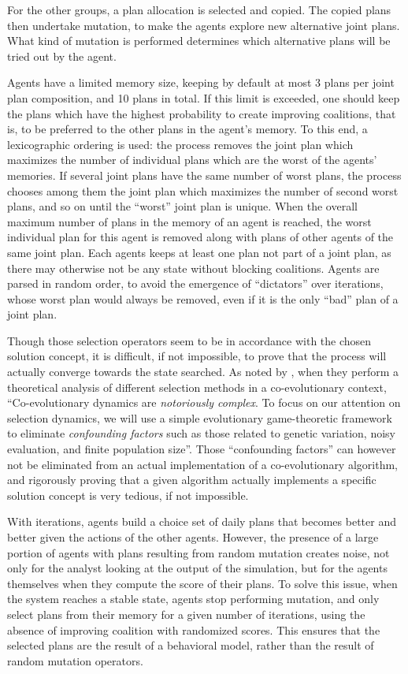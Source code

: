 {For the other groups, a plan allocation is selected and copied. The
copied plans then undertake mutation, to make the agents explore new
alternative joint plans. What kind of mutation is performed determines
which alternative plans will be tried out by the agent.

Agents have a limited memory size, keeping by default at most 3 plans per joint
plan composition, and 10 plans in total. If this limit is exceeded, one
should keep the plans which have the highest probability to create
improving coalitions, that is, to be preferred to the other plans in the
agent's memory. To this end, a lexicographic ordering is used: the
process removes the joint plan which maximizes the number of individual
plans which are the worst of the agents' memories. If several joint
plans have the same number of worst plans, the process chooses among
them the joint plan which maximizes the number of second worst plans,
and so on until the ``worst'' joint plan is unique. When the overall
maximum number of plans in the memory of an agent is reached, the worst
individual plan for this agent is removed along with plans of other
agents of the same joint plan. Each agents keeps at least one plan not
part of a joint plan, as there may otherwise not be any state without
blocking coalitions. Agents are parsed in random order, to avoid the
emergence of ``dictators'' over iterations, whose worst plan would
always be removed, even if it is the only ``bad'' plan of a joint plan.

Though those selection operators seem to be in accordance with the
chosen solution concept, it is difficult, if not impossible, to prove
that the process will actually converge towards the state searched. As
noted by \cite{FiciciEtAl_ITEC_2005}, when they perform a theoretical
analysis of different selection methods in a co-evolutionary context,
``Co-evolutionary dynamics are \emph{notoriously complex}. To focus on
our attention on selection dynamics, we will use a simple evolutionary
game-theoretic framework to eliminate \emph{confounding factors} such as
those related to genetic variation, noisy evaluation, and finite
population size''. Those ``confounding factors'' can however not be
eliminated from an actual implementation of a co-evolutionary algorithm,
and rigorously proving that a given algorithm actually implements a
specific solution concept is very tedious, if not impossible.

With iterations, agents build a choice set of daily plans that becomes
better and better given the actions of the other agents. However, the
presence of a large portion of agents with plans resulting from random
mutation creates noise, not only for the analyst looking at the output
of the simulation, but for the agents themselves when they compute the
score of their plans. To solve this issue, when the system reaches a
stable state, agents stop performing mutation, and only select plans
from their memory for a given number of iterations, using the absence of improving
coalition with randomized scores. This ensures that the selected plans
are the result of a behavioral model, rather than the result of random
mutation operators.

}

